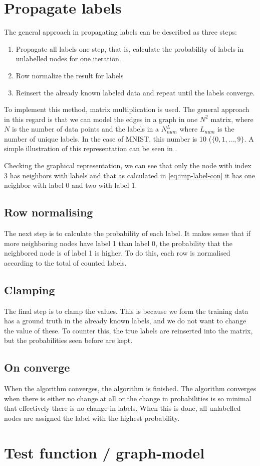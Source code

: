 \section{Propagate labels}
The general approach in propagating labels can be described as three steps:

\begin{enumerate}[label=Step \arabic*:]
    \item Propagate all labels one step, that is, calculate the probability of labels in unlabelled nodes for one iteration.
    \item Row normalize the result for labels
    \item Reinsert the already known labeled data and repeat until the labels converge.
\end{enumerate}
To implement this method, matrix multiplication is used. The general approach in this regard is that we can model the edges in a graph in one $N^2$ matrix, where $N$ is the number of data points and the labels in a $N^L_{num}$ where $L_{num}$ is the number of unique labels. In the case of MNIST, this number is 10 ($\{0,1,...,9\}$. A simple illustration of this representation can be seen in .


Checking the graphical representation, we can see that only the node with index 3 has neighbors with labels and that as calculated in \cref{eq:imp-label-con} it has one neighbor with label 0 and two with label 1.

\subsection{Row normalising}
The next step is to calculate the probability of each label. It makes sense that if more neighboring nodes have label 1 than label 0, the probability that the neighbored node is of label 1 is higher. To do this, each row is normalised according to the total of counted labels.

\subsection{Clamping}
The final step is to clamp the values. This is because we form the training data has a ground truth in the already known labels, and we do not want to change the value of these. To counter this, the true labels are reinserted into the matrix, but the probabilities seen before are kept.

\subsection{On converge}
When the algorithm converges, the algorithm is finished. The algorithm converges when there is either no change at all or the change in probabilities is so minimal that effectively there is no change in labels. When this is done, all unlabelled nodes are assigned the label with the highest probability.

\section{Test function / graph-model}
